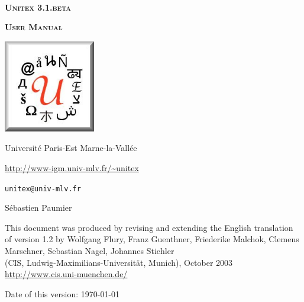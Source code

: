 
\begin{titlepage}
\begin{center}

~

\vspace{3cm}
\Huge
\textsc{\textbf{Unitex 3.1.beta}}

\vspace{1cm}

\huge
\textsc{\textbf{User Manual}}

\vspace{2cm}

  \begin{center}
    \includegraphics[width=4cm]{resources/img/logo-Unitex.png}
  \end{center}
\normalsize

\vspace{2cm}

\LARGE

Université Paris-Est Marne-la-Vallée
\bigskip
\normalsize

\url{http://www-igm.univ-mlv.fr/~unitex}

\verb$unitex@univ-mlv.fr$

\vspace{0.5cm}

Sébastien Paumier
\bigskip

This document was produced by revising and extending the English translation\\
of version 1.2 by Wolfgang Flury, Franz Guenthner, Friederike Malchok, Clemens Marschner, 
 Sebastian Nagel, Johannes Stiehler\\
 (CIS, Ludwig-Maximilians-Universit\"at, Munich), October 2003\\
\url{http://www.cis.uni-muenchen.de/}

\bigskip
\mydate
Date of this version: \today
\end{center}

\end{titlepage}
